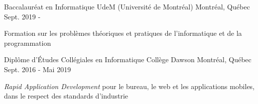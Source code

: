 

\begin{cventries}

  \cventry
    {Baccalauréat en Informatique} %
    {UdeM (Université de Montréal)} %
    {Montréal, Québec} %
    {Sept. 2019 -} %
    {
      \begin{cvitems} %
        \item {Formation sur les problèmes théoriques et pratiques de l'informatique et de la programmation}
      \end{cvitems}
    }
  \cventry
    {Diplôme d'Études Collégiales en Informatique} %
    {Collège Dawson} %
    {Montréal, Québec} %
    {Sept. 2016 - Mai 2019} %
    {
      \begin{cvitems} %
        \item {\textit{Rapid Application Development} pour le bureau, le web et les applications mobiles, dans le respect des standards d'industrie}
      \end{cvitems}
    }

\end{cventries}
